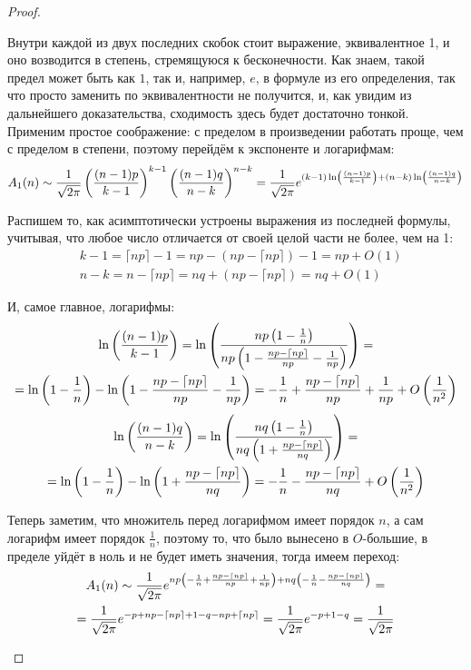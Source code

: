 \begin{proof}
\begin{itemize}
        Внутри каждой из двух последних скобок стоит выражение, эквивалентное 1, и оно возводится в степень, стремящуюся к бесконечности. Как знаем, такой предел может быть как $1$, так и, например, $e$, в формуле из его определения, так что просто заменить по эквивалентности не получится, и, как увидим из дальнейшего доказательства, сходимость здесь будет достаточно тонкой. Применим простое соображение: с пределом в произведении работать проще, чем с пределом в степени, поэтому перейдём к экспоненте и логарифмам:
        \[
            A_1(n) \sim \frac{1}{\sqrt{2 \pi}} \left(\frac{(n-1)p}{k-1}\right)^{k-1} \left(\frac{(n-1)q}{n-k}\right)^{n-k} = \frac{1}{\sqrt{2 \pi}} e^{(k-1) \ln\left(\frac{(n-1)p}{k-1}\right) + (n-k) \ln\left(\frac{(n-1)q}{n-k}\right)}
        \]

        Распишем то, как асимптотически устроены выражения из последней формулы, учитывая, что любое число отличается от своей целой части не более, чем на 1:
        \begin{align*}
            & k-1 = \lceil np \rceil - 1 = np - (np - \lceil np \rceil) - 1 = np + O(1)
            \\
            & n-k = n - \lceil np \rceil = nq + (np - \lceil np \rceil) = nq + O(1)
        \end{align*}    

        И, самое главное, логарифмы:
        \begin{multline*}
            \ln\left(\frac{(n-1)p}{k-1}\right) = \ln\left(\frac{np \left(1 - \frac{1}{n}\right)}{np \left(1 - \frac{np - \lceil np \rceil}{np} - \frac{1}{np}\right)}\right) =
            \\
            = \ln\left(1 - \frac{1}{n}\right) - \ln\left(1 - \frac{np - \lceil np \rceil}{np} - \frac{1}{np}\right) = - \frac{1}{n} + \frac{np - \lceil np \rceil}{np} + \frac{1}{np} + O\left(\frac{1}{n^2}\right)
        \end{multline*}
        \begin{multline*}
            \ln\left(\frac{(n-1)q}{n-k}\right) = \ln\left(\frac{nq \left(1 - \frac{1}{n}\right)}{nq \left(1 + \frac{np - \lceil np \rceil}{nq}\right)}\right) =
            \\
            = \ln\left(1 - \frac{1}{n}\right) - \ln\left(1 + \frac{np - \lceil np \rceil}{nq}\right) = - \frac{1}{n} - \frac{np - \lceil np \rceil}{nq} + O\left(\frac{1}{n^2}\right)
        \end{multline*}

        Теперь заметим, что множитель перед логарифмом имеет порядок $n$, а сам логарифм имеет порядок $\frac{1}{n}$, поэтому то, что было вынесено в $O$-большие, в пределе уйдёт в ноль и не будет иметь значения, тогда имеем переход:
        \begin{multline*}
            A_1(n) \sim \frac{1}{\sqrt{2\pi}} e^{np\left(- \frac{1}{n} + \frac{np - \lceil np \rceil}{np} + \frac{1}{np}\right) + nq\left(- \frac{1}{n} - \frac{np - \lceil np \rceil}{nq}\right)} =
            \\
            = \frac{1}{\sqrt{2\pi}} e^{-p + np - \lceil np \rceil + 1 - q - np + \lceil np \rceil} = \frac{1}{\sqrt{2\pi}} e^{-p + 1 - q} = \frac{1}{\sqrt{2\pi}}
        \end{multline*}


\end{itemize}
\end{proof}
